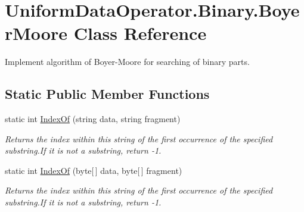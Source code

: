 \hypertarget{class_uniform_data_operator_1_1_binary_1_1_boyer_moore}{}\section{Uniform\+Data\+Operator.\+Binary.\+Boyer\+Moore Class Reference}
\label{class_uniform_data_operator_1_1_binary_1_1_boyer_moore}


Implement algorithm of Boyer-\/\+Moore for searching of binary parts.  


\subsection*{Static Public Member Functions}
\begin{DoxyCompactItemize}
\item 
static int \mbox{\hyperlink{class_uniform_data_operator_1_1_binary_1_1_boyer_moore_abd5f37407f9c6ab55a7d537e65bdd22c}{Index\+Of}} (string data, string fragment)
\begin{DoxyCompactList}\small\item\em Returns the index within this string of the first occurrence of the specified substring.\+If it is not a substring, return -\/1. \end{DoxyCompactList}\item 
static int \mbox{\hyperlink{class_uniform_data_operator_1_1_binary_1_1_boyer_moore_abf651c244965e9d5da5a9b5af10a77b5}{Index\+Of}} (byte\mbox{[}$\,$\mbox{]} data, byte\mbox{[}$\,$\mbox{]} fragment)
\begin{DoxyCompactList}\small\item\em Returns the index within this string of the first occurrence of the specified substring.\+If it is not a substring, return -\/1. \end{DoxyCompactList}\end{DoxyCompactItemize}
